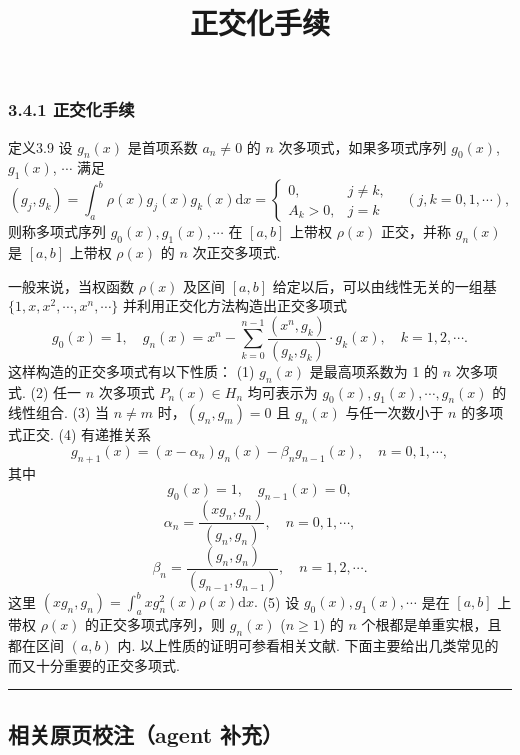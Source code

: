 \documentclass[
  10pt,
  fontset=fandol]{ctexart}
\title{正交化手续}
\author{}
\date{}
\begin{document}
\maketitle

\subsubsection{3.4.1 正交化手续}\label{ux6b63ux4ea4ux5316ux624bux7eed}

定义3.9 设 \(g_n(x)\) 是首项系数 \(a_n \neq 0\) 的 \(n\) 次多项式，如果多项式序列 \(g_0(x)\), \(g_1(x)\), \(\cdots\) 满足 \[
(g_j, g_k) = \int_a^b \rho(x) g_j(x) g_k(x) \mathrm{d}x = \begin{cases} 0, & j \neq k, \\ A_k > 0, & j = k \end{cases} \quad (j, k = 0, 1, \cdots),
\] 则称多项式序列 \(g_0(x), g_1(x), \cdots\) 在 \([a, b]\) 上带权 \(\rho(x)\) 正交，并称 \(g_n(x)\) 是 \([a, b]\) 上带权 \(\rho(x)\) 的 \(n\) 次正交多项式.

一般来说，当权函数 \(\rho(x)\) 及区间 \([a, b]\) 给定以后，可以由线性无关的一组基 \(\{1,\allowbreak  x,\allowbreak  x^2,\allowbreak  \cdots,\allowbreak  x^n,\allowbreak  \cdots\}\) 并利用正交化方法构造出正交多项式 \[
g_0(x) = 1, \quad g_n(x) = x^n - \sum_{k=0}^{n-1} \frac{(x^n, g_k)}{(g_k, g_k)} \cdot g_k(x), \quad k = 1, 2, \cdots.
\] 这样构造的正交多项式有以下性质： (1) \(g_n(x)\) 是最高项系数为 1 的 \(n\) 次多项式. (2) 任一 \(n\) 次多项式 \(P_n(x) \in H_n\) 均可表示为 \(g_0(x), g_1(x), \cdots, g_n(x)\) 的线性组合. (3) 当 \(n \neq m\) 时，\((g_n, g_m) = 0\) 且 \(g_n(x)\) 与任一次数小于 \(n\) 的多项式正交. (4) 有递推关系 \[
g_{n+1}(x) = (x - \alpha_n)g_n(x) - \beta_n g_{n-1}(x), \quad n = 0, 1, \cdots,
\] 其中 \[
g_0(x) = 1, \quad g_{n-1}(x) = 0,
\] \[
\alpha_n = \frac{(xg_n, g_n)}{(g_n, g_n)}, \quad n = 0, 1, \cdots,
\] \[
\beta_n = \frac{(g_n, g_n)}{(g_{n-1}, g_{n-1})}, \quad n = 1, 2, \cdots.
\] 这里 \((xg_n, g_n) = \int_a^b xg_n^2(x) \rho(x) \mathrm{d}x.\) (5) 设 \(g_0(x), g_1(x), \cdots\) 是在 \([a, b]\) 上带权 \(\rho(x)\) 的正交多项式序列，则 \(g_n(x)\) (\(n \geq 1\)) 的 \(n\) 个根都是单重实根，且都在区间 \((a, b)\) 内. 以上性质的证明可参看相关文献. 下面主要给出几类常见的而又十分重要的正交多项式.

\begin{center}\rule{0.5\linewidth}{0.5pt}\end{center}

\subsection{相关原页校注（agent 补充）}\label{ux76f8ux5173ux539fux9875ux6821ux6ce8agent-ux8865ux5145}
\end{document}
